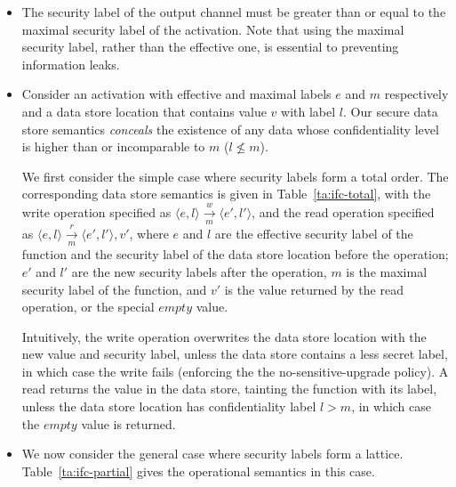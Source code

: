 \documentclass[acmsmall,10pt,review,anonymous]{acmart}\settopmatter{printfolios=true}
\newcommand{\semruletxt}[3]{ #1 \xrightarrow[m]{#2} #3}
\newcommand{\tuple}[1]{\langle #1 \rangle}
\begin{document}
\begin{itemize}
        \begin{itemize}
            \item The security label of the output channel must be 
                greater than or equal to the maximal security label of 
                the activation.  Note that using the maximal security 
                label, rather than the effective one, is essential to 
                preventing information leaks.

            \item Consider an activation with effective and maximal 
                labels $e$ and $m$ respectively and a data store 
                location that contains value $v$ with label $l$.  Our 
                secure data store semantics \emph{conceals} the 
                existence of any data whose confidentiality level is 
                higher than or incomparable to $m$ ($l \nleq m$).  
                
                We first consider the simple case where security 
                labels form a total order. The corresponding data 
                store semantics is given in Table~\ref{ta:ifc-total}, 
                with the write operation specified as 
                $\semruletxt{\tuple{e,l}}{w}{\tuple{e',l'}}$, and the 
                read operation specified as 
                $\semruletxt{\tuple{e,l}}{r}{\tuple{e',l'}, v'}$, 
                where $e$ and $l$ are the effective security label of 
                the function and the security label of the data store 
                location before the operation; $e'$ and $l'$ are the 
                new security labels after the operation, $m$ is the 
                maximal security label of the function, and $v'$ is 
                the value returned by the read operation, or the 
                special $empty$ value.

                Intuitively, the write operation overwrites the data 
                store location with the new value and security label, 
                unless the data store contains a less secret label, in 
                which case the write fails (enforcing the the 
                no-sensitive-upgrade policy).  A read returns the 
                value in the data store, tainting the function with 
                its label, unless the data store location has 
                confidentiality label $l>m$, in which case the $empty$ 
                value is returned.  
        
            \item We now consider the general case where security 
                labels form a lattice.  Table~\ref{ta:ifc-partial} 
                gives the operational semantics in this case.  


\end{itemize}
\end{itemize}
\end{document}
